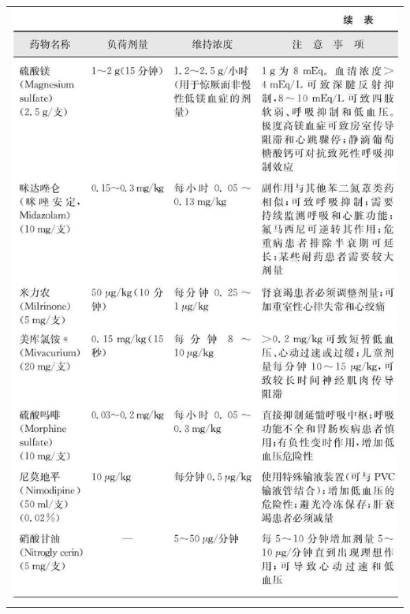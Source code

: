 \begin{longtable}{c}
\includegraphics[width=\textwidth,height=\textheight,keepaspectratio]{./images/Image00327.jpg}\\

\end{longtable}
